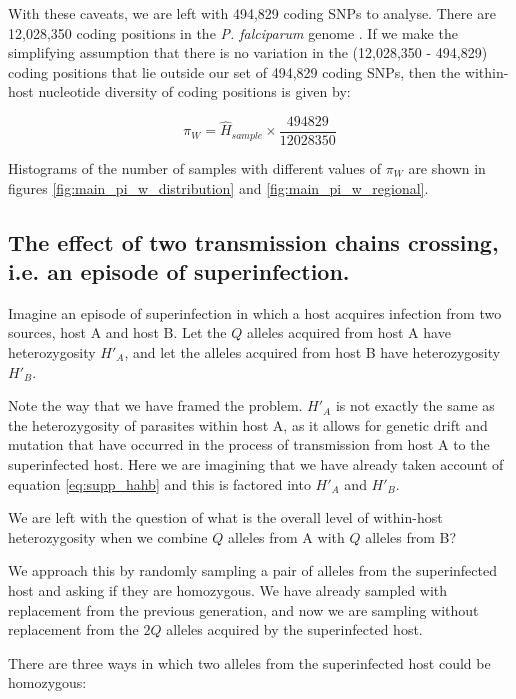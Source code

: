 \documentclass[_main.tex]{subfiles}
\begin{document}
With these caveats, we are left with 494,829 coding SNPs to analyse.   There are 12,028,350 coding positions in the \textit{P. falciparum} genome \cite{Gardner2002}.  If we make the simplifying assumption that there is no variation in the (12,028,350 - 494,829) coding positions that lie outside our set of 494,829 coding SNPs, then the within-host nucleotide diversity of coding positions is given by: 

\begin{equation*}
\pi_W = \widehat{H}_{sample} \times \frac{494829}{12028350}
\end{equation*}

Histograms of the number of samples with different values of $\pi_W$ are shown in figures \ref{fig:main_pi_w_distribution} and \ref{fig:main_pi_w_regional}.  


\subsection{The effect of two transmission chains crossing, i.e. an episode of superinfection.}
\label{supp_episode_superinfection}

Imagine an episode of superinfection in which a host acquires infection from two sources, host A and host B.  Let the $Q$ alleles acquired from host A have heterozygosity $H'_A$, and let the alleles acquired from host B have heterozygosity $H'_B$.

Note the way that we have framed the problem.  $H'_A$ is not exactly the same as the heterozygosity of parasites within host A, as it allows for genetic drift and mutation that have occurred in the process of transmission from host A to the superinfected host.  Here we are imagining that we have already taken account of equation \ref{eq:supp_hahb} and this is factored into $H'_A$ and $H'_B$.

We are left with the question of what is the overall level of within-host heterozygosity when we combine $Q$ alleles from A with $Q$ alleles from B?  

We approach this by randomly sampling a pair of alleles from the superinfected host and asking if they are homozygous.  We have already sampled with replacement from the previous generation, and now we are sampling without replacement from the $2Q$ alleles acquired by the superinfected host.

There are three ways in which two alleles from the superinfected host could be homozygous:
\end{document}
